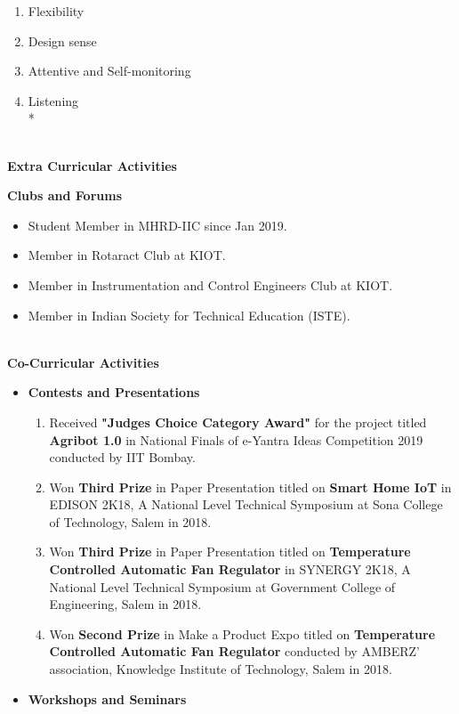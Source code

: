 \documentclass{article}
\begin{document}
\begin{flushleft}
\begin{enumerate}
			\item Flexibility
			\item Design sense
			\item Attentive and Self-monitoring
			\item Listening\\*
		\end{enumerate}
		\large \textbf{\\Extra Curricular Activities}
		\item \textbf{Clubs and Forums}
			\begin{itemize}
					\setlength\itemsep{0.01em}
				\item Student Member in MHRD-IIC since Jan 2019.	
				\item Member in Rotaract Club at KIOT.
				\item Member in Instrumentation and Control Engineers Club at KIOT.
				\item Member in Indian Society for Technical Education (ISTE).
			\end{itemize}
		\large \textbf{\\Co-Curricular Activities}
		\begin{itemize}
			\item \textbf{Contests and Presentations}
			\begin{enumerate}
			\justifying
					\setlength\itemsep{0.01em}
				\item Received \textbf{"Judges Choice Category Award"} for the project titled \textbf{Agribot 1.0} in National Finals of e-Yantra Ideas Competition 2019 conducted by IIT Bombay.  
				\item Won \textbf{Third Prize} in Paper Presentation titled on \textbf{Smart Home IoT} in EDISON 2K18, A National Level Technical Symposium at Sona College of Technology, Salem in 2018.
				\item Won \textbf{Third Prize} in Paper Presentation titled on \textbf{Temperature Controlled Automatic Fan Regulator} in SYNERGY 2K18, A National Level Technical Symposium at Government College of Engineering, Salem in 2018.
				\item Won \textbf{Second Prize} in Make a Product Expo titled on \textbf{Temperature Controlled Automatic Fan Regulator} conducted by AMBERZ’ association, Knowledge Institute of Technology, Salem in 2018.
			\end{enumerate}
			\item \textbf{Workshops and Seminars}
			\begin{enumerate}
			\justifying
					\setlength\itemsep{0.01em}

\end{enumerate}
\end{itemize}
\end{flushleft}
\end{document}
